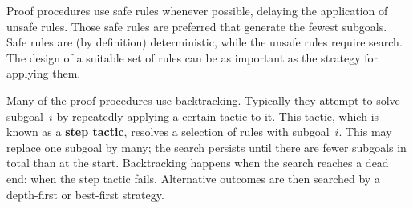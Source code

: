 Proof procedures use safe rules whenever possible, delaying the application
of unsafe rules.  Those safe rules are preferred that generate the fewest
subgoals.  Safe rules are (by definition) deterministic, while the unsafe
rules require search.  The design of a suitable set of rules can be as
important as the strategy for applying them.

Many of the proof procedures use backtracking.  Typically they attempt to
solve subgoal~$i$ by repeatedly applying a certain tactic to it.  This
tactic, which is known as a {\bf step tactic}, resolves a selection of
rules with subgoal~$i$.  This may replace one subgoal by many;  the
search persists until there are fewer subgoals in total than at the start.
Backtracking happens when the search reaches a dead end: when the step
tactic fails.  Alternative outcomes are then searched by a depth-first or
best-first strategy.  
